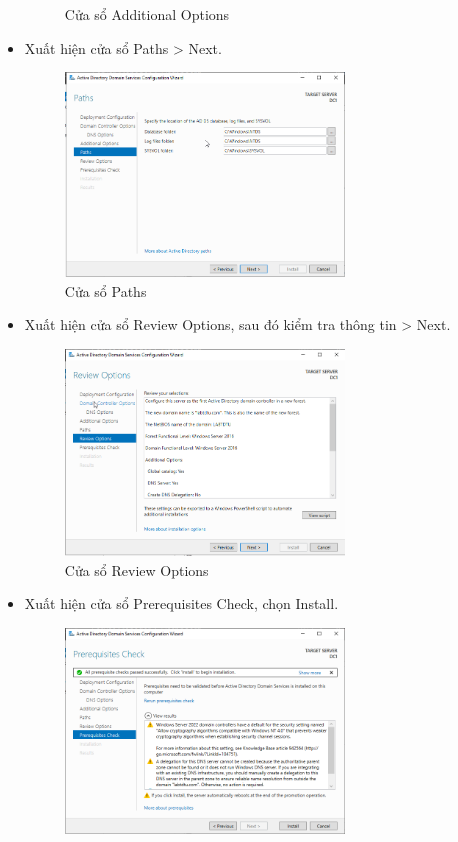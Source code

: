 \documentclass[13pt]{report}
\begin{document}
\begin{itemize}
\begin{figure}[htp]
			\caption{Cửa sổ Additional Options}
		\end{figure}
		\item Xuất hiện cửa sổ Paths > Next.
		\begin{figure}[htp]
			\centering
			\includegraphics[width=0.7\textwidth]{image/Gui/ADDC/15.png}
			\caption{Cửa sổ Paths}
		\end{figure}
		\newpage
		\item Xuất hiện cửa sổ Review Options, sau đó kiểm tra thông tin > Next.
		\begin{figure}[htp]
			\centering
			\includegraphics[width=0.7\textwidth]{image/Gui/ADDC/16.png}
			\caption{Cửa sổ Review Options}
		\end{figure}
		\item Xuất hiện cửa sổ Prerequisites Check, chọn Install.
		\begin{figure}[htp]
			\centering
			\includegraphics[width=0.7\textwidth]{image/Gui/ADDC/17.png}

\end{figure}
\end{itemize}
\end{document}
